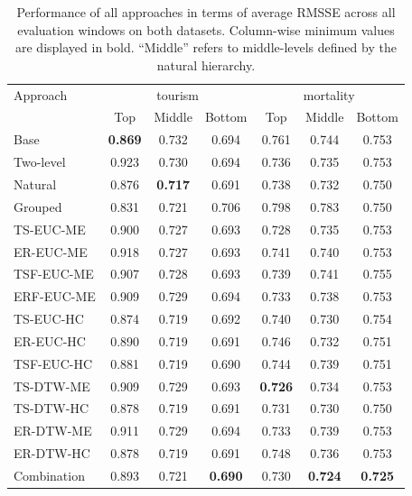 \documentclass{article}
\numberwithin{equation}{section}
\theoremstyle{plain}
\theoremstyle{definition}
\theoremstyle{remark}
\begin{document}
\begin{table}[h!]
    \centering
\caption{\label{tab:P3_rmsse}Performance of all approaches in terms of average RMSSE across all evaluation windows on both datasets. Column-wise minimum values are displayed in bold. ``Middle'' refers to middle-levels defined by the natural hierarchy. }

\begin{tabular}{lcccccc}
\toprule
 Approach & \multicolumn{3}{c}{tourism} & \multicolumn{3}{c}{mortality} \\ 
 \cmidrule(lr){2-4} \cmidrule(lr){5-7}
 & Top & Middle & Bottom & Top & Middle & Bottom \\ \midrule
 Base & \textbf{0.869} & 0.732 & 0.694 & 0.761 & 0.744 & 0.753 \\
Two-level & 0.923 & 0.730 & 0.694 & 0.736 & 0.735 & 0.753 \\
Natural & 0.876 & \textbf{0.717} & 0.691 & 0.738 & 0.732 & 0.750 \\
Grouped & 0.831  & 0.721 & 0.706 & 0.798 & 0.783 & 0.750 \\
TS-EUC-ME & 0.900 & 0.727 & 0.693 & 0.728 & 0.735 & 0.753 \\
ER-EUC-ME & 0.918 & 0.727 & 0.693 & 0.741 & 0.740 & 0.753 \\
TSF-EUC-ME & 0.907 & 0.728 & 0.693 & 0.739 & 0.741 & 0.755 \\
ERF-EUC-ME & 0.909 & 0.729 & 0.694 & 0.733 & 0.738 & 0.753 \\
TS-EUC-HC & 0.874 & 0.719 & 0.692 & 0.740 & 0.730 & 0.754 \\
ER-EUC-HC & 0.890 & 0.719 & 0.691 & 0.746 & 0.732 & 0.751 \\
TSF-EUC-HC & 0.881 & 0.719 & 0.690 & 0.744 & 0.739 & 0.751 \\
TS-DTW-ME & 0.909 & 0.729 & 0.693 & \textbf{0.726} & 0.734 & 0.753 \\
TS-DTW-HC & 0.878 & 0.719 & 0.691 & 0.731 & 0.730 & 0.750 \\
ER-DTW-ME & 0.911 & 0.729 & 0.694 & 0.733 & 0.739 & 0.753 \\
ER-DTW-HC & 0.878 & 0.719 & 0.691 & 0.748 & 0.736 & 0.753 \\ 
Combination & 0.893 & 0.721 & \textbf{0.690} & 0.730 & \textbf{0.724} & \textbf{0.725} \\
\bottomrule\end{tabular}

\end{table}
\end{document}
